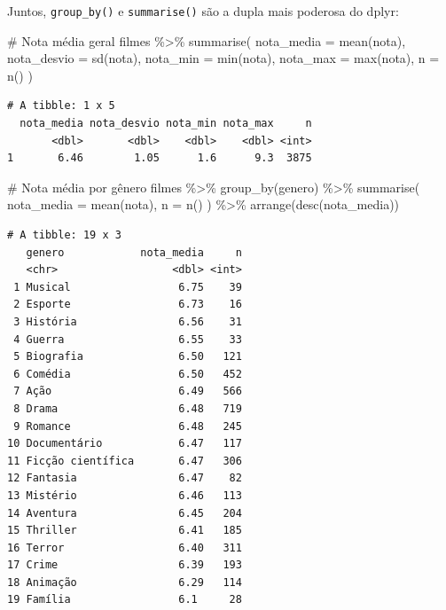\documentclass[
  letterpaper,
]{scrbook}
\newenvironment{Shaded}{\begin{snugshade}}{\end{snugshade}}
\newcommand{\AttributeTok}[1]{\textcolor[rgb]{0.40,0.45,0.13}{#1}}
\newcommand{\CommentTok}[1]{\textcolor[rgb]{0.37,0.37,0.37}{#1}}
\newcommand{\FunctionTok}[1]{\textcolor[rgb]{0.28,0.35,0.67}{#1}}
\newcommand{\NormalTok}[1]{\textcolor[rgb]{0.00,0.23,0.31}{#1}}
\newcommand{\SpecialCharTok}[1]{\textcolor[rgb]{0.37,0.37,0.37}{#1}}
\begin{document}
Juntos, \texttt{group\_by()} e \texttt{summarise()} são a dupla mais
poderosa do dplyr:

\begin{Shaded}
\begin{Highlighting}[]
\CommentTok{\# Nota média geral}
\NormalTok{filmes }\SpecialCharTok{\%\textgreater{}\%} 
  \FunctionTok{summarise}\NormalTok{(}
    \AttributeTok{nota\_media =} \FunctionTok{mean}\NormalTok{(nota),}
    \AttributeTok{nota\_desvio =} \FunctionTok{sd}\NormalTok{(nota),}
    \AttributeTok{nota\_min =} \FunctionTok{min}\NormalTok{(nota),}
    \AttributeTok{nota\_max =} \FunctionTok{max}\NormalTok{(nota),}
    \AttributeTok{n =} \FunctionTok{n}\NormalTok{()}
\NormalTok{  )}
\end{Highlighting}
\end{Shaded}

\begin{verbatim}
# A tibble: 1 x 5
  nota_media nota_desvio nota_min nota_max     n
       <dbl>       <dbl>    <dbl>    <dbl> <int>
1       6.46        1.05      1.6      9.3  3875
\end{verbatim}

\begin{Shaded}
\begin{Highlighting}[]
\CommentTok{\# Nota média por gênero}
\NormalTok{filmes }\SpecialCharTok{\%\textgreater{}\%} 
  \FunctionTok{group\_by}\NormalTok{(genero) }\SpecialCharTok{\%\textgreater{}\%} 
  \FunctionTok{summarise}\NormalTok{(}
    \AttributeTok{nota\_media =} \FunctionTok{mean}\NormalTok{(nota),}
    \AttributeTok{n =} \FunctionTok{n}\NormalTok{()}
\NormalTok{  ) }\SpecialCharTok{\%\textgreater{}\%} 
  \FunctionTok{arrange}\NormalTok{(}\FunctionTok{desc}\NormalTok{(nota\_media))}
\end{Highlighting}
\end{Shaded}

\begin{verbatim}
# A tibble: 19 x 3
   genero            nota_media     n
   <chr>                  <dbl> <int>
 1 Musical                 6.75    39
 2 Esporte                 6.73    16
 3 História                6.56    31
 4 Guerra                  6.55    33
 5 Biografia               6.50   121
 6 Comédia                 6.50   452
 7 Ação                    6.49   566
 8 Drama                   6.48   719
 9 Romance                 6.48   245
10 Documentário            6.47   117
11 Ficção científica       6.47   306
12 Fantasia                6.47    82
13 Mistério                6.46   113
14 Aventura                6.45   204
15 Thriller                6.41   185
16 Terror                  6.40   311
17 Crime                   6.39   193
18 Animação                6.29   114
19 Família                 6.1     28
\end{verbatim}
\end{document}
